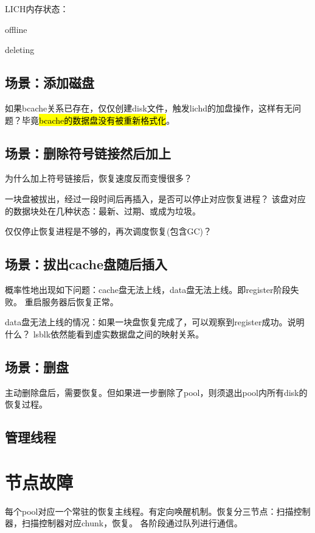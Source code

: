 LICH内存状态：
\begin{enumbox}
\item offline
\item deleting
\end{enumbox}

\subsection{场景：添加磁盘}

如果bcache关系已存在，仅仅创建disk文件，触发lichd的加盘操作，这样有无问题？毕竟\hl{bcache的数据盘没有被重新格式化}。

\subsection{场景：删除符号链接然后加上}

为什么加上符号链接后，恢复速度反而变慢很多？

一块盘被拔出，经过一段时间后再插入，是否可以停止对应恢复进程？
该盘对应的数据块处在几种状态：最新、过期、或成为垃圾。

仅仅停止恢复进程是不够的，再次调度恢复(包含GC)？

\subsection{场景：拔出cache盘随后插入}

概率性地出现如下问题：cache盘无法上线，data盘无法上线。即register阶段失败。
重启服务器后恢复正常。

data盘无法上线的情况：如果一块盘恢复完成了，可以观察到register成功。说明什么？
lsblk依然能看到虚实数据盘之间的映射关系。

\subsection{场景：删盘}

主动删除盘后，需要恢复。但如果进一步删除了pool，则须退出pool内所有disk的恢复过程。

\subsection{管理线程}

\section{节点故障}

每个pool对应一个常驻的恢复主线程。有定向唤醒机制。恢复分三节点：扫描控制器，扫描控制器对应chunk，恢复。
各阶段通过队列进行通信。

